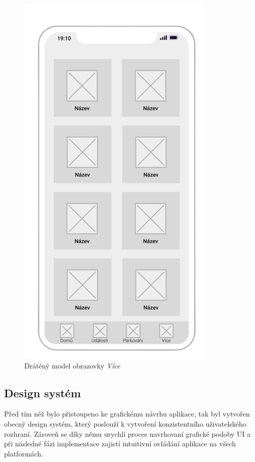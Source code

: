 \begin{minipage}[t]{0.45\textwidth}
\begin{figure}[H]
    \includegraphics[width=.7\textwidth]{more_wireframe.png}
    \caption{Drátěný model obrazovky \textit{Více}}
    \label{fig:wireframe4}
  \end{figure}
\end{minipage}

\subsection{Design systém} \label{designSystemSection}
Před tím něž bylo přistoupeno ke grafickému návrhu aplikace, tak byl vytvořen obecný design systém, který poslouží k vytvoření 
konzistentního uživatelského rozhraní. Zároveň se díky němu urychlí proces navrhovaní grafické podoby UI a při následné fázi implementace 
zajistí intuitivní ovládání aplikace na všech platformách. 


